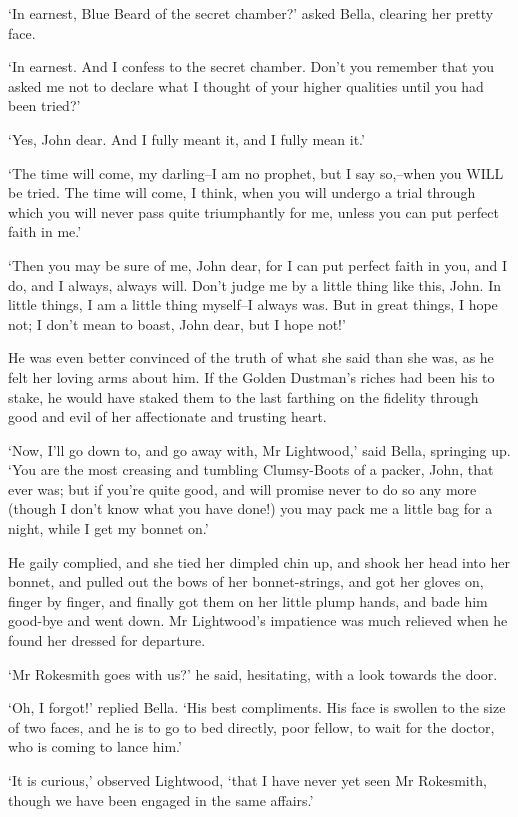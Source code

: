 ‘In earnest, Blue Beard of the secret chamber?’ asked Bella, clearing
her pretty face.

‘In earnest. And I confess to the secret chamber. Don’t you remember
that you asked me not to declare what I thought of your higher qualities
until you had been tried?’

‘Yes, John dear. And I fully meant it, and I fully mean it.’

‘The time will come, my darling--I am no prophet, but I say so,--when
you WILL be tried. The time will come, I think, when you will undergo
a trial through which you will never pass quite triumphantly for me,
unless you can put perfect faith in me.’

‘Then you may be sure of me, John dear, for I can put perfect faith in
you, and I do, and I always, always will. Don’t judge me by a little
thing like this, John. In little things, I am a little thing myself--I
always was. But in great things, I hope not; I don’t mean to boast, John
dear, but I hope not!’

He was even better convinced of the truth of what she said than she was,
as he felt her loving arms about him. If the Golden Dustman’s riches had
been his to stake, he would have staked them to the last farthing on the
fidelity through good and evil of her affectionate and trusting heart.

‘Now, I’ll go down to, and go away with, Mr Lightwood,’ said Bella,
springing up. ‘You are the most creasing and tumbling Clumsy-Boots of a
packer, John, that ever was; but if you’re quite good, and will promise
never to do so any more (though I don’t know what you have done!) you
may pack me a little bag for a night, while I get my bonnet on.’

He gaily complied, and she tied her dimpled chin up, and shook her head
into her bonnet, and pulled out the bows of her bonnet-strings, and
got her gloves on, finger by finger, and finally got them on her
little plump hands, and bade him good-bye and went down. Mr Lightwood’s
impatience was much relieved when he found her dressed for departure.

‘Mr Rokesmith goes with us?’ he said, hesitating, with a look towards
the door.

‘Oh, I forgot!’ replied Bella. ‘His best compliments. His face is
swollen to the size of two faces, and he is to go to bed directly, poor
fellow, to wait for the doctor, who is coming to lance him.’

‘It is curious,’ observed Lightwood, ‘that I have never yet seen Mr
Rokesmith, though we have been engaged in the same affairs.’

